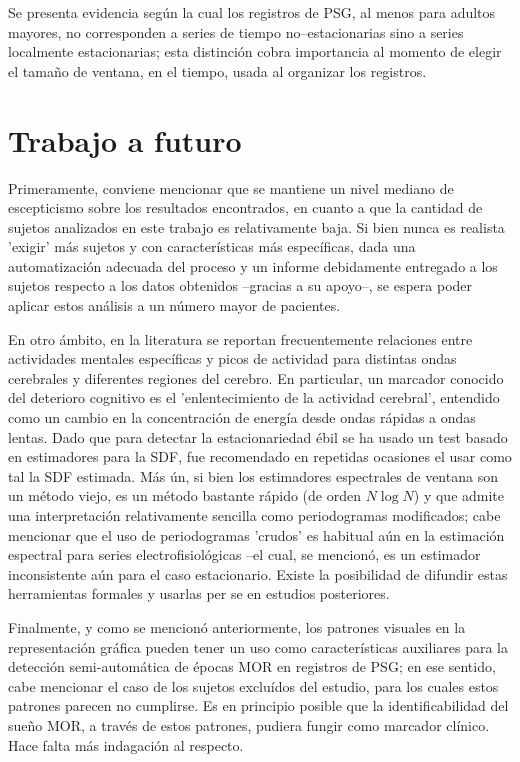 \documentclass[12pt,a4paper]{mitthesis}
\begin{document}
Se presenta evidencia seg\'un la cual los registros de PSG, al menos para adultos mayores, no 
corresponden a series de tiempo no--estacionarias sino a series localmente estacionarias; esta 
distinci\'on cobra importancia al momento de elegir el tama\~no de ventana, en el tiempo, usada al 
organizar los registros.


\section{Trabajo a futuro}

Primeramente, conviene mencionar que se mantiene un nivel mediano de escepticismo sobre los 
resultados encontrados, en cuanto a que la cantidad de sujetos analizados en este trabajo es 
relativamente baja. Si bien nunca es realista 'exigir' m\'as sujetos y con caracter\'isticas m\'as 
espec\'ificas, dada una automatizaci\'on adecuada del proceso y un informe debidamente entregado a 
los sujetos respecto a los datos obtenidos --gracias a su apoyo--, se espera poder aplicar estos 
an\'alisis a un n\'umero mayor de pacientes.

En otro \'ambito, en la literatura se reportan frecuentemente relaciones entre actividades mentales 
espec\'ificas y picos de actividad para distintas ondas cerebrales y diferentes regiones del 
cerebro.
En particular, un marcador conocido del deterioro cognitivo es el 'enlentecimiento de la actividad
cerebral', entendido como un cambio en la concentraci\'on de energ\'ia desde ondas r\'apidas a 
ondas lentas.
Dado que para detectar la estacionariedad \'ebil se ha usado un test basado en estimadores para la 
SDF, fue recomendado en repetidas ocasiones el usar como tal la SDF estimada. 
M\'as \'un, si bien los estimadores espectrales de ventana son un m\'etodo viejo, es un m\'etodo 
bastante r\'apido (de orden $N \log{N}$) y que admite una interpretaci\'on relativamente sencilla 
como periodogramas modificados; cabe mencionar que el uso de periodogramas 'crudos' es habitual 
a\'un en la estimaci\'on espectral para series electrofisiol\'ogicas --el cual, se mencion\'o, es 
un estimador inconsistente a\'un para el caso estacionario.
Existe la posibilidad de difundir estas herramientas formales y usarlas per se en estudios
posteriores.


Finalmente, y como se mencion\'o anteriormente, los patrones visuales en la representaci\'on 
gr\'afica pueden tener un uso como caracter\'isticas auxiliares para la detecci\'on 
semi-autom\'atica de \'epocas MOR en registros de PSG; en ese sentido, cabe mencionar el caso de 
los sujetos exclu\'idos del estudio, para los cuales estos patrones parecen no cumplirse. 
Es en principio posible que la identificabilidad del sue\~no MOR, a trav\'es de estos patrones, 
pudiera fungir como marcador cl\'inico. Hace falta m\'as indagaci\'on al respecto. 
\end{document}
